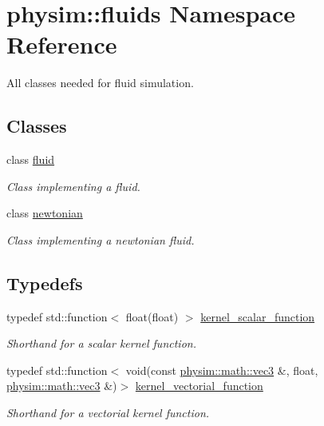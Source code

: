 \hypertarget{namespacephysim_1_1fluids}{}\section{physim\+:\+:fluids Namespace Reference}
\label{namespacephysim_1_1fluids}


All classes needed for fluid simulation.  


\subsection*{Classes}
\begin{DoxyCompactItemize}
\item 
class \hyperlink{classphysim_1_1fluids_1_1fluid}{fluid}
\begin{DoxyCompactList}\small\item\em Class implementing a fluid. \end{DoxyCompactList}\item 
class \hyperlink{classphysim_1_1fluids_1_1newtonian}{newtonian}
\begin{DoxyCompactList}\small\item\em Class implementing a newtonian fluid. \end{DoxyCompactList}\end{DoxyCompactItemize}
\subsection*{Typedefs}
\begin{DoxyCompactItemize}
\item 
typedef std\+::function$<$ float(float) $>$ \hyperlink{namespacephysim_1_1fluids_a22c55c76ab3fe3de79dada15e2f9c2d6}{kernel\+\_\+scalar\+\_\+function}
\begin{DoxyCompactList}\small\item\em Shorthand for a scalar kernel function. \end{DoxyCompactList}\item 
typedef std\+::function$<$ void(const \hyperlink{structphysim_1_1math_1_1vec3}{physim\+::math\+::vec3} \&, float, \hyperlink{structphysim_1_1math_1_1vec3}{physim\+::math\+::vec3} \&)$>$ \hyperlink{namespacephysim_1_1fluids_ab109a55050c62abe9c1c23924f620754}{kernel\+\_\+vectorial\+\_\+function}
\begin{DoxyCompactList}\small\item\em Shorthand for a vectorial kernel function. \end{DoxyCompactList}\end{DoxyCompactItemize}


